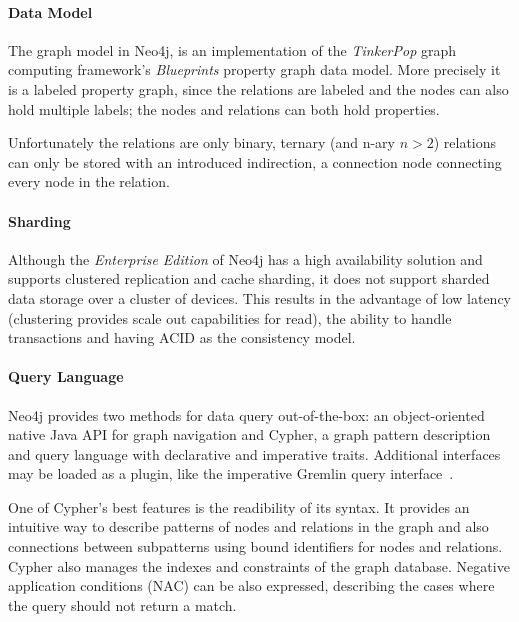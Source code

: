 \paragraph{Data Model}
The graph model in Neo4j,  is an implementation of the \emph{TinkerPop} graph computing framework's \emph{Blueprints} property graph data model. More precisely it is a labeled property graph, since the relations are labeled and the nodes can also hold multiple labels; the nodes and relations can both hold properties.

Unfortunately the relations are only binary, ternary (and n-ary $n>2$) relations can only be stored with an introduced indirection, a connection node connecting every node in the relation.

\paragraph{Sharding}
Although the \emph{Enterprise Edition} of Neo4j has a high availability solution and supports clustered replication and cache sharding, it does not support sharded data storage over a cluster of devices. This results in the advantage of low latency (clustering provides scale out capabilities for read), the ability to handle transactions and having ACID as the consistency model.~\cite{neo4j-product}

\paragraph{Query Language}
Neo4j provides two methods for data query out-of-the-box: an object-oriented native Java API for graph navigation and Cypher, a graph pattern description and query language with declarative and imperative traits. Additional interfaces may be loaded as a plugin, like the imperative Gremlin query interface~\cite{neo4j-gremlin-plugin}.

One of Cypher's best features is the readibility of its syntax. It provides an intuitive way to describe patterns of nodes and relations in the graph and also connections between subpatterns using bound identifiers for nodes and relations. Cypher also manages the indexes and constraints of the graph database. Negative application conditions (NAC) can be also expressed, describing the cases where the query should not return a match.

